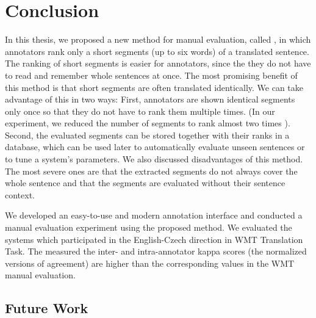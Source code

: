 \chapter{Conclusion}
\label{chapter:conclusion}

In this thesis, we proposed a new method for manual evaluation, called
, in which annotators rank only a short segments (up to six
words) of a translated sentence. The ranking of short segments is easier for
annotators, since the they do not have to read and remember whole sentences at
once. The most promising benefit of this method is that short segments are
often translated identically.  We can take advantage of this in two ways:
First, annotators are shown identical segments only once so that they do not
have to rank them multiple times. (In our experiment, we reduced the number of
segments to rank almost two times ). Second, the
evaluated segments can be stored together with their ranks in a database, which
can be used later to automatically evaluate unseen sentences or to tune a
system's parameters. We also discussed disadvantages of this method. The most
severe ones are that the extracted segments do not always cover the whole
sentence and that the segments are evaluated without their sentence context.

We developed an easy-to-use and modern annotation interface and conducted a
manual evaluation experiment using the proposed method. We evaluated the
systems which participated in the English-Czech direction in WMT Translation
Task. The measured the inter- and intra-annotator kappa scores (the normalized
versions of agreement) are higher than the corresponding values in the WMT
manual evaluation.




\section{Future Work}
